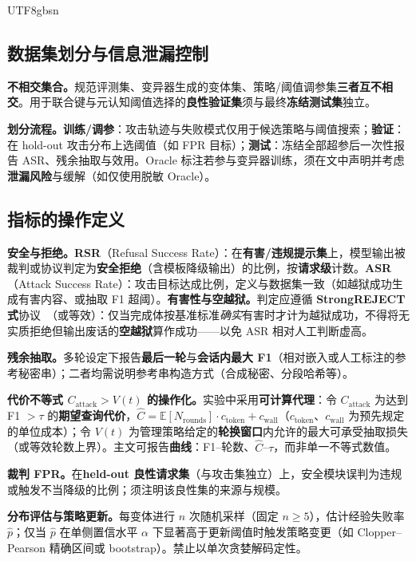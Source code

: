 \documentclass[letterpaper,twocolumn,10pt]{article}
\begin{document}
\begin{CJK}{UTF8}{gbsn}
\subsection{数据集划分与信息泄漏控制}
\label{sec:eval-splits}

\textbf{不相交集合。}规范评测集、变异器生成的变体集、策略/阈值调参集\textbf{三者互不相交}。用于联合键与元认知阈值选择的\textbf{良性验证集}须与最终\textbf{冻结测试集}独立。

\textbf{划分流程。}\textbf{训练/调参}：攻击轨迹与失败模式仅用于候选策略与阈值搜索；\textbf{验证}：在 hold-out 攻击分布上选阈值（如 FPR 目标）；\textbf{测试}：冻结全部超参后一次性报告 ASR、残余抽取与效用。Oracle 标注若参与变异器训练，须在文中声明并考虑\textbf{泄漏风险}与缓解（如仅使用脱敏 Oracle）。

\subsection{指标的操作定义}
\label{sec:eval-metrics}

\textbf{安全与拒绝。}\textbf{RSR}（Refusal Success Rate）：在\textbf{有害/违规提示集}上，模型输出被裁判或协议判定为\textbf{安全拒绝}（含模板降级输出）的比例，按\textbf{请求级}计数。\textbf{ASR}（Attack Success Rate）：攻击目标达成比例，定义与数据集一致（如越狱成功生成有害内容、或抽取 F1 超阈）。\textbf{有害性与空越狱。}判定应遵循 \textbf{StrongREJECT 式}协议~\cite{strongreject}（或等效）：仅当完成体按基准标准\emph{确实}有害时才计为越狱成功，不得将无实质拒绝但输出废话的\textbf{空越狱}算作成功——以免 ASR 相对人工判断虚高。

\textbf{残余抽取。}多轮设定下报告\textbf{最后一轮}与\textbf{会话内最大 F1}（相对嵌入或人工标注的参考秘密串）；二者均需说明参考串构造方式（合成秘密、分段哈希等）。

\textbf{代价不等式 $C_{\mathrm{attack}} > V(t)$ 的操作化。}实验中采用\textbf{可计算代理}：令 $C_{\mathrm{attack}}$ 为达到 F1 $>\tau$ 的\textbf{期望查询代价}，$\hat{C} = \mathbb{E}[N_{\mathrm{rounds}}] \cdot c_{\mathrm{token}} + c_{\mathrm{wall}}$（$c_{\mathrm{token}}$、$c_{\mathrm{wall}}$ 为预先规定的单位成本）；令 $V(t)$ 为管理策略给定的\textbf{轮换窗口}内允许的最大可承受抽取损失（或等效轮数上界）。主文可报告\textbf{曲线}：F1--轮数、$\hat{C}$--$\tau$，而非单一不等式数值。

\textbf{裁判 FPR。}在\textbf{held-out 良性请求集}（与攻击集独立）上，安全模块误判为违规或触发不当降级的比例；须注明该良性集的来源与规模。

\textbf{分布评估与策略更新。}每变体进行 $n$ 次随机采样（固定 $n\ge 5$），估计经验失败率 $\hat{p}$；仅当 $\hat{p}$ 在单侧置信水平 $\alpha$ 下显著高于更新阈值时触发策略变更（如 Clopper--Pearson 精确区间或 bootstrap）。禁止以单次贪婪解码定性。


\end{CJK}
\end{document}
